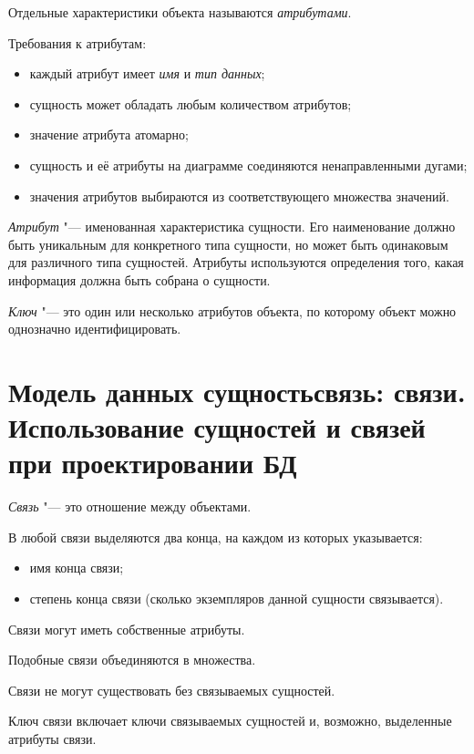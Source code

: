 Отдельные характеристики объекта называются \emph{атрибутами}.

Требования к атрибутам:
\begin{itemize}
	\item каждый атрибут имеет \emph{имя} и \emph{тип данных};
	\item сущность может обладать любым количеством атрибутов;
	\item значение атрибута атомарно;
	\item сущность и её атрибуты на диаграмме соединяются ненаправленными дугами;
	\item значения атрибутов выбираются из соответствующего множества значений.
\end{itemize}

\begin{definition}
	\emph{Атрибут} "--- именованная характеристика сущности.
	Его наименование должно быть уникальным для конкретного типа сущности, но может быть одинаковым для различного типа сущностей.
	Атрибуты используются определения того, какая информация должна быть собрана о сущности.
\end{definition}

\begin{definition}
	\emph{Ключ} "--- это один или несколько атрибутов объекта, по которому объект можно однозначно идентифицировать.
\end{definition}

\section{Модель данных сущностьсвязь: связи. Использование сущностей и связей при проектировании БД}

\begin{definition}
	\emph{Связь} "--- это отношение между объектами.
\end{definition}

В любой связи выделяются два конца, на каждом из которых указывается:
\begin{itemize}
	\item имя конца связи;
	\item степень конца связи (сколько экземпляров данной сущности связывается).
\end{itemize}

\begin{props}
	\item Связи могут иметь собственные атрибуты.
	\item Подобные связи объединяются в множества.
	\item Связи не могут существовать без связываемых сущностей.
	\item Ключ связи включает ключи связываемых сущностей и, возможно, выделенные атрибуты связи.
\end{props}

